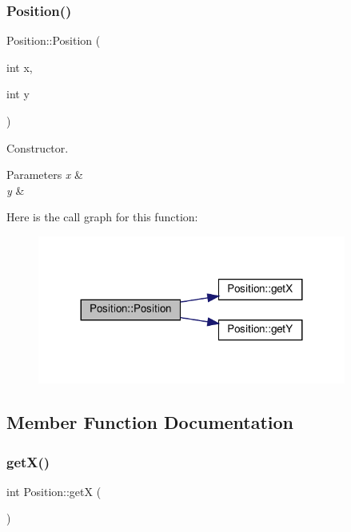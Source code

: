 \subsubsection{\texorpdfstring{Position()}{Position()}}
{\footnotesize\ttfamily Position\+::\+Position (\begin{DoxyParamCaption}\item[{int}]{x,  }\item[{int}]{y }\end{DoxyParamCaption})\hspace{0.3cm}{\ttfamily [inline]}}



Constructor. 


\begin{DoxyParams}{Parameters}
{\em x} & \\
\hline
{\em y} & \\
\hline
\end{DoxyParams}
Here is the call graph for this function\+:\nopagebreak
\begin{figure}[H]
\begin{center}
\leavevmode
\includegraphics[width=287pt]{classPosition_a6e36cf0fee251e74cfedb86f4e99558d_cgraph}
\end{center}
\end{figure}


\subsection{Member Function Documentation}
\mbox{\label{classPosition_a4e65d4b865c08791302956e2912a2300}} 
\subsubsection{\texorpdfstring{get\+X()}{getX()}}
{\footnotesize\ttfamily int Position\+::getX (\begin{DoxyParamCaption}{ }\end{DoxyParamCaption})}



